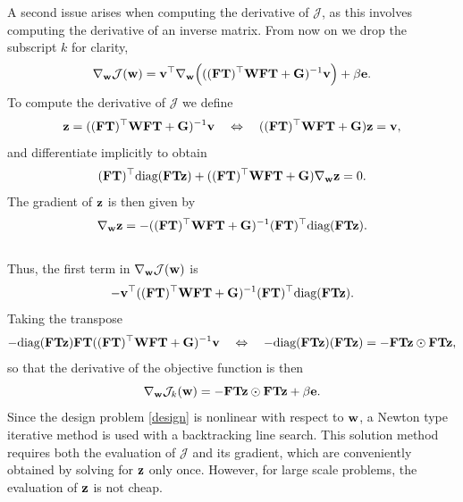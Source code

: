 \documentclass[12pt]{article}
\newcommand{\bfF}	{{\bf{F}}}
\newcommand{\bfG}	{{\bf{G}}}
\newcommand{\bfT}	{{\bf{T}}}
\newcommand{\bfW}	{{\bf{W}}}
\newcommand{\bfe}	{{\bf{e}}}
\newcommand{\bfv}	{{\bf{v}}}
\newcommand{\bfw}	{{\bf{w}}}
\newcommand{\bfz}	{{\bf{z}}}
\newcommand{\JJ} 	 {\mathcal{J}}    %
\begin{document}
A second issue arises when computing the derivative  of $\JJ$, as this involves computing the derivative of an inverse matrix. From now on we drop the subscript $k$ for clarity,
\begin{equation*}
\nabla_{\bfw} \JJ(\bfw) =\bfv^{\top} \nabla_{\bfw}\Big(((\bfF \bfT)^{\top} \bfW \bfF\bfT + \bfG)^{-1}\bfv \Big) + \beta \bfe.
\end{equation*}
To compute  the derivative of $\JJ$ we define  
\begin{equation}
\label{eq:z}
\bfz = ((\bfF \bfT)^{\top} \bfW \bfF \bfT + \bfG)^{-1}\bfv \quad \Leftrightarrow \quad
((\bfF \bfT)^{\top} \bfW \bfF \bfT + \bfG)\bfz = \bfv,
\end{equation}
%
and differentiate implicitly to obtain 
\begin{equation*}
(\bfF \bfT)^{\top}\text{diag}(\bfF \bfT \bfz) + ((\bfF \bfT)^{\top} \bfW \bfF \bfT + \bfG)\nabla_{\bfw}\bfz = 0.
\end{equation*}
The gradient of $\bfz$ is then given by
\begin{equation*}
\nabla_{\bfw}\bfz = -((\bfF \bfT)^{\top} \bfW \bfF \bfT + \bfG)^{-1} (\bfF \bfT)^{\top}\text{diag}(\bfF \bfT \bfz).
\end{equation*}
\\
Thus, the first term in $\nabla_{\bfw} \JJ(\bfw)$ is
\begin{equation*}
-\bfv^{\top}((\bfF \bfT)^{\top} \bfW \bfF \bfT + \bfG)^{-1} (\bfF \bfT)^{\top}\text{diag}(\bfF \bfT \bfz). 
\end{equation*}
Taking the transpose 
\begin{equation*}
-\text{diag}(\bfF \bfT\bfz)\bfF\bfT((\bfF\bfT)^{\top} \bfW \bfF\bfT + \bfG)^{-1} \bfv
\quad \Leftrightarrow\quad -\text{diag}(\bfF \bfT\bfz)(\bfF \bfT\bfz) = -\bfF\bfT \bfz \odot \bfF\bfT \bfz,
\end{equation*}
so that the derivative of the objective function is then 
\begin{equation}
\nabla_{\bfw} \JJ_{k}(\bfw) =  -\bfF\bfT \bfz \odot \bfF \bfT\bfz + \beta \bfe.
\end{equation}
Since the design problem \eqref{design} is nonlinear with respect to $\bfw$, a Newton type iterative method is used with a backtracking line search. This solution method requires both the evaluation of $\JJ$ and  its gradient, which are conveniently obtained by solving for $\bfz$ only once. However, for large scale problems, the evaluation of $\bfz$ is not cheap.
\end{document}
